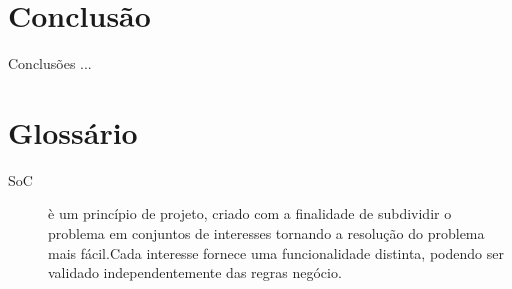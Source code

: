 \documentclass[tc,openright]{iiufrgs}
\begin{document}
\chapter{Conclusão}

Conclusões ...



\chapter*{Glossário}

\begin{description}
	\item[SoC] è um princípio de projeto, criado com a finalidade de subdividir o problema em conjuntos de interesses tornando a resolução do problema mais fácil.Cada interesse fornece uma funcionalidade distinta, podendo ser validado independentemente das regras negócio.\cite{pressman2010engineering}
\end{description}

\appendix
\end{document}
